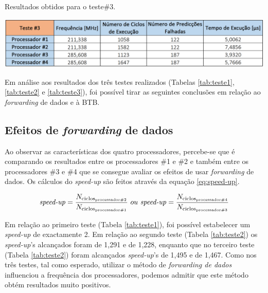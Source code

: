 \documentclass[11pt]{article}
\numberwithin{equation}{section}
\begin{document}
\begin{table}[H]
	\centering
	\caption{Resultados obtidos para o teste$\#$3.}
	\vspace{-1.5mm}
	\includegraphics[keepaspectratio=true, scale=0.40]{tabelas/teste3}
	\label{tab:teste3}
\end{table}

Em análise aos resultados dos três testes realizados (Tabelas \ref{tab:teste1}, \ref{tab:teste2} e \ref{tab:teste3}), foi possível tirar as seguintes conclusões em relação ao \textit{forwarding} de dados e à BTB.

\subsection{Efeitos de \textit{forwarding} de dados}

Ao observar as características dos quatro processadores, percebe-se que é comparando os resultados entre os processadores \#1 e \#2 e também entre os processadores \#3 e \#4 que se consegue avaliar os efeitos de usar \textit{forwarding} de dados. Os cálculos do \textit{speed-up} são feitos através da equação \ref{eq:speed-up}.

\vspace{-3mm}
\begin{equation}
\text{\textit{speed-up}} = \frac{N_{\text{ciclos\textsubscript{processador\#2}}}}{N_{\text{ciclos\textsubscript{processador\#1}}}} ~ ou ~ \text{\textit{speed-up}}= \frac{N_{\text{ciclos\textsubscript{processador\#4}}}}{N_{\text{ciclos\textsubscript{processador\#3}}}}
\label{eq:speed-up}
\end{equation}

\vspace{1mm}
Em relação ao primeiro teste (Tabela \ref{tab:teste1}), foi possível estabelecer um \textit{speed-up} de exactamente 2. Em relação ao segundo teste (Tabela \ref{tab:teste2}) os \textit{speed-up}'s alcançados foram de 1,291 e de 1,228, enquanto que no terceiro teste (Tabela \ref{tab:teste2}) foram alcançados \textit{speed-up}'s de 1,495 e de 1,467. Como nos três testes, tal como esperado, utilizar o método de \textit{forwarding de dados} influenciou a frequência dos processadores, podemos admitir que este método obtém resultados muito positivos.
\end{document}

